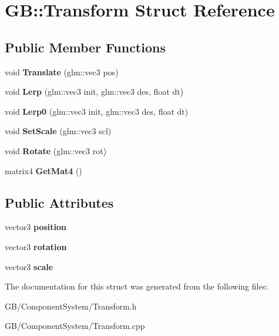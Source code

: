 \hypertarget{struct_g_b_1_1_transform}{}\section{GB\+::Transform Struct Reference}
\label{struct_g_b_1_1_transform}
\subsection*{Public Member Functions}
\begin{DoxyCompactItemize}
\item 
\mbox{\label{struct_g_b_1_1_transform_afb059a059b25c071fcd45c95864f424d}} 
void {\bfseries Translate} (glm\+::vec3 pos)
\item 
\mbox{\label{struct_g_b_1_1_transform_af692c841429f3a68c3aa8cb68de9e60f}} 
void {\bfseries Lerp} (glm\+::vec3 init, glm\+::vec3 des, float dt)
\item 
\mbox{\label{struct_g_b_1_1_transform_a4438cba39fc777e5d233736d6d47a2c3}} 
void {\bfseries Lerp0} (glm\+::vec3 init, glm\+::vec3 des, float dt)
\item 
\mbox{\label{struct_g_b_1_1_transform_addf8eecb0740ab00dda319e59e8a1c9e}} 
void {\bfseries Set\+Scale} (glm\+::vec3 scl)
\item 
\mbox{\label{struct_g_b_1_1_transform_a07a5173bf155075bfd47ec429e7d1a59}} 
void {\bfseries Rotate} (glm\+::vec3 rot)
\item 
\mbox{\label{struct_g_b_1_1_transform_a04764cdfd1d2a2444b1cb3b06fa2f9c2}} 
matrix4 {\bfseries Get\+Mat4} ()
\end{DoxyCompactItemize}
\subsection*{Public Attributes}
\begin{DoxyCompactItemize}
\item 
\mbox{\label{struct_g_b_1_1_transform_a5ea3c8cbfa7ba30fb39bbf8edae90862}} 
vector3 {\bfseries position}
\item 
\mbox{\label{struct_g_b_1_1_transform_a3148e7e98c40a1fc1c27e8bbf38ee374}} 
vector3 {\bfseries rotation}
\item 
\mbox{\label{struct_g_b_1_1_transform_a50ce2ef77b6322a446c7452779d0f61d}} 
vector3 {\bfseries scale}
\end{DoxyCompactItemize}


The documentation for this struct was generated from the following files\+:\begin{DoxyCompactItemize}
\item 
G\+B/\+Component\+System/Transform.\+h\item 
G\+B/\+Component\+System/Transform.\+cpp\end{DoxyCompactItemize}

